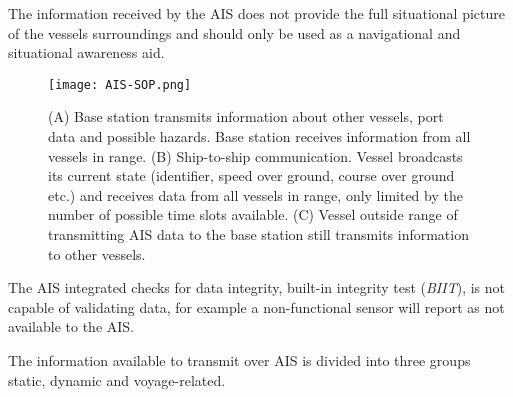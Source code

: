 \documentclass[../main.tex]{subfiles}
\begin{document}
The information received by the AIS does not provide the full situational picture of the vessels surroundings and should only be used as a navigational and situational awareness aid.

\begin{figure}[H]
\centering
\texttt{[image: AIS-SOP.png]}
\caption{(A) Base station transmits information about other vessels, port data and possible hazards. Base station receives information from all vessels in range. (B) Ship-to-ship communication. Vessel broadcasts its current state (identifier, speed over ground, course over ground etc.) and receives data from all vessels in range, only limited by the number of possible time slots available. (C) Vessel outside range of transmitting AIS data to the base station still transmits information to other vessels.}
\label{fig:ais-sop}
\end{figure}

The AIS integrated checks for data integrity, built-in integrity test (\textit{BIIT}), is not capable of validating data, for example a non-functional sensor will report as not available to the AIS.

The information available to transmit over AIS is divided into three groups static, dynamic and voyage-related.
\end{document}
